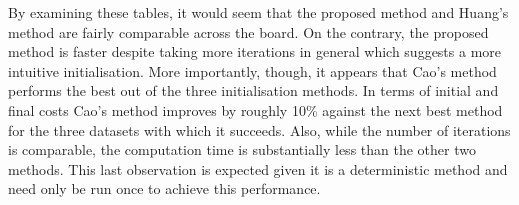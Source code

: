 \begin{table}
    \begin{subtable}{\textwidth}
        \resizebox{\textwidth}{!}{%
            
        }
        \caption{%
            the breast cancer dataset with \(k=8\)%
        }\label{tab:breast_cancer_knee}
    \end{subtable}\vspace{1em}

    \begin{subtable}{\textwidth}
        \resizebox{\textwidth}{!}{}
        \caption{%
            the mushroom dataset with \(k=17\)%
        }\label{tab:mushroom_knee}
    \end{subtable}\vspace{1em}

    \begin{subtable}{\textwidth}
        \resizebox{\textwidth}{!}{}
        \caption{%
            the nursery dataset with \(k=23\)
        }\label{tab:nursery_knee}
    \end{subtable}\vspace{1em}

    \begin{subtable}{\textwidth}
        \resizebox{\textwidth}{!}{}
        \caption{%
            the soybean dataset with \(k=8\)
        }\label{tab:soybean_knee}
    \end{subtable}

    \caption{%
        Metric results when using the knee point detection algorithm
    }\label{tab:metrics_knee}
\end{table}

By examining these tables, it would seem that the proposed method and Huang's
method are fairly comparable across the board. On the contrary, the proposed
method is faster despite taking more iterations in general which suggests a more
intuitive initialisation. More importantly, though, it appears that Cao's method
performs the best out of the three initialisation methods. In terms of initial
and final costs Cao's method improves by roughly 10\% against the next best
method for the three datasets with which it succeeds. Also, while the number of
iterations is comparable, the computation time is substantially less than the
other two methods. This last observation is expected given it is a deterministic
method and need only be run once to achieve this performance.

